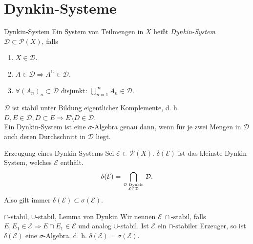 \section*{Dynkin-Systeme}

\begin{karte}{Dynkin-System}
	Ein System von Teilmengen in \(X\) heißt 
	\textit{Dynkin-System} \(\mathcal{D} \subset \mathcal{P}(X)\), falls 
	\begin{enumerate}
		\item \(X \in \mathcal{D}\).
		\item \( A \in \mathcal{D} \Rightarrow A^C \in \mathcal{D} \).
		\item \( \forall (A_n)_n \subset \mathcal{D} \) disjunkt: \( \bigcup_{n=1}^\infty A_n \in \mathcal{D} \).
	\end{enumerate}
	\( \mathcal{D} \) ist stabil unter Bildung eigentlicher Komplemente, d. h. \( D,E \in \mathcal{D}, D \subset E \Rightarrow E \setminus D \in \mathcal{D} \).\\
	Ein Dynkin-System ist eine \(\sigma\)-Algebra genau 
	dann, wenn für je zwei Mengen in \(\mathcal{D}\) auch 
	deren Durchschnitt in \( \mathcal{D} \) liegt.
\end{karte}
\begin{karte}{Erzeugung eines Dynkin-Systems}
	Sei \( \mathcal{E} \subset \mathcal{P}(X) \). \(\delta(\mathcal{E})\) ist das kleinste Dynkin-System, 
	welches \( \mathcal{E} \) enthält. 
	\[ \delta(\mathcal{E}) = \bigcap_{\mathcal{D} \text{ Dynkin} \atop \mathcal{E} \subset \mathcal{D} } \mathcal{D}.  \]
	Also gilt immer \( \delta(\mathcal{E}) \subset \sigma(\mathcal{E}) \). 
\end{karte}
\begin{karte}{\( \cap\)-stabil, \(\cup\)-stabil, Lemma von Dynkin}
	Wir nennen \( \mathcal{E}\ \cap \)-stabil, falls 
	\( E, E_1 \in \mathcal{E} \Rightarrow E \cap E_1 \in \mathcal{E} \) und analog \(\cup\)-stabil.
	Ist \( \mathcal{E} \) ein \(\cap\)-stabiler Erzeuger, so ist \(\delta(\mathcal{E})\) eine \( \sigma \)-Algebra, 
	d. h. \( \delta(\mathcal{E}) = \sigma(\mathcal{E}) \).
\end{karte}